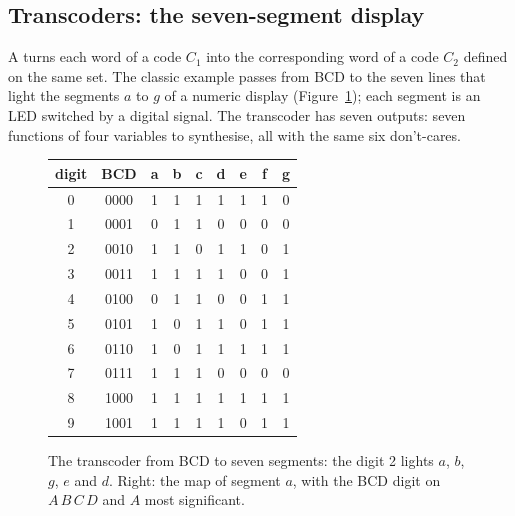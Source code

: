 \subsection{Transcoders: the seven-segment display}

A  turns each word of a code $C_1$ into the corresponding
word of a code $C_2$ defined on the same set. The classic example passes from
BCD to the seven lines that light the segments $a$ to $g$ of a numeric display
(Figure~\ref{fig:cm:seg}); each segment is an LED switched by a digital
signal. The transcoder has seven outputs: seven functions of four variables
to synthesise, all with the same six don't-cares.

\begin{figure}[htb]
\centering
\begin{minipage}{0.22\textwidth}\centering
{}
\end{minipage}
\begin{minipage}{0.38\textwidth}\centering\scriptsize\ttfamily\setlength{\tabcolsep}{2.6pt}
\begin{tabular}{cc|ccccccc}
\textrm{digit}&\textrm{BCD}&a&b&c&d&e&f&g\\\hline
0&0000&1&1&1&1&1&1&0\\1&0001&0&1&1&0&0&0&0\\\rowcolor{prgred!12}2&0010&1&1&0&1&1&0&1\\3&0011&1&1&1&1&0&0&1\\4&0100&0&1&1&0&0&1&1\\
5&0101&1&0&1&1&0&1&1\\6&0110&1&0&1&1&1&1&1\\7&0111&1&1&1&0&0&0&0\\8&1000&1&1&1&1&1&1&1\\9&1001&1&1&1&1&0&1&1
\end{tabular}
\end{minipage}
\begin{minipage}{0.36\textwidth}\centering
{}
\end{minipage}
\caption{The transcoder from BCD to seven segments: the digit 2 lights $a$,
$b$, $g$, $e$ and $d$. Right: the map of segment $a$, with the BCD digit on
$A\,B\,C\,D$ and $A$ most significant.}
\label{fig:cm:seg}
\end{figure}

